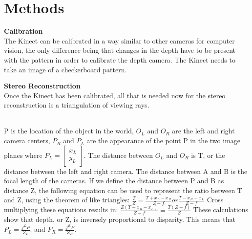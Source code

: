 \documentclass[12pt,twocolumn]{article}
\begin{document}
\section{Methods}
{ \bf Calibration}\\
The Kinect can be calibrated in a way similar to other cameras for computer vision, the only difference being that changes in the depth have to be present  with the pattern in order to calibrate the depth camera. The Kinect needs to take an image of a checkerboard pattern.

{ \bf Stereo Reconstruction}\\ 
Once the Kinect has been calibrated, all that is needed now for the stereo reconstruction is a triangulation of viewing rays. \\
 \\
\indent P is the location of the object in the world, $O_{L}$ and $O_{R}$ are the left and right camera centers, $P_{R}$ and $P_{L}$ are the appearance of the point P in the two image planes where $P_{L}= \begin{bmatrix}
x_{L} \\
y_{L} \end{bmatrix} $. The distance between $O_{L}$ and $O_{R}$ is T, or the distance between the left and right camera. The distance between A and B is the focal length of the cameras. If we define the distance between P and B as distance Z, the following equation  can be used to represent the ratio between T and Z, using the theorem of like triangles: 
$\frac{T}{Z}=\frac{T+x_{L}-x_{R}}{Z-f} or \frac{T-{x_{R}-x_{L}}}{Z-f} $ 
Cross multiplying these equations results in: 
$\frac{Z(T-x_{R}-x_{L})}{Z-f} = \frac{T(Z-f)}{Z} $ 
These calculations show that depth, or Z, is inversely proportional to disparity. This means that  $P_{L}= \frac{f^{L}P}{Z_{L}}. $ and $P_{R}= \frac{f^{R}P}{Z_{R}}. $ \\ \\
\end{document}
